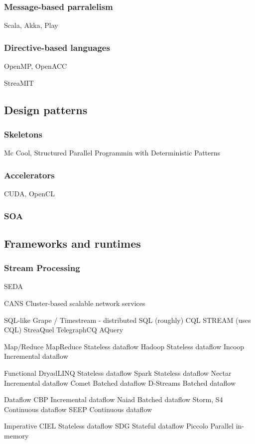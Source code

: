 \subsubsection{Message-based parralelism}
Scala, Akka, Play

\subsubsection{Directive-based languages}
OpenMP, OpenACC


StreaMIT



\subsection{Design patterns}

\subsubsection{Skeletons}
Mc Cool, Structured Parallel Programmin with Deterministic Patterns

\subsubsection{Accelerators}
CUDA, OpenCL

\subsubsection{SOA}



\subsection{Frameworks and runtimes}

\subsubsection{Stream Processing}

SEDA

CANS Cluster-based scalable network services

SQL-like
  Grape / Timestream - distributed SQL (roughly)
  CQL
  STREAM (uses CQL)
  StreaQuel
  TelegraphCQ
  AQuery

Map/Reduce
  MapReduce    Stateless dataflow
  Hadoop       Stateless dataflow
  Incoop       Incremental dataflow

Functional
  DryadLINQ    Stateless dataflow
  Spark        Stateless dataflow
  Nectar       Incremental dataflow
  Comet        Batched dataflow
  D-Streams    Batched dataflow

Dataflow
  CBP          Incremental dataflow
  Naiad        Batched dataflow
  Storm, S4    Continuous dataflow
  SEEP         Continuous dataflow

Imperative
  CIEL         Stateless dataflow
  SDG          Stateful dataflow
  Piccolo      Parallel in-memory